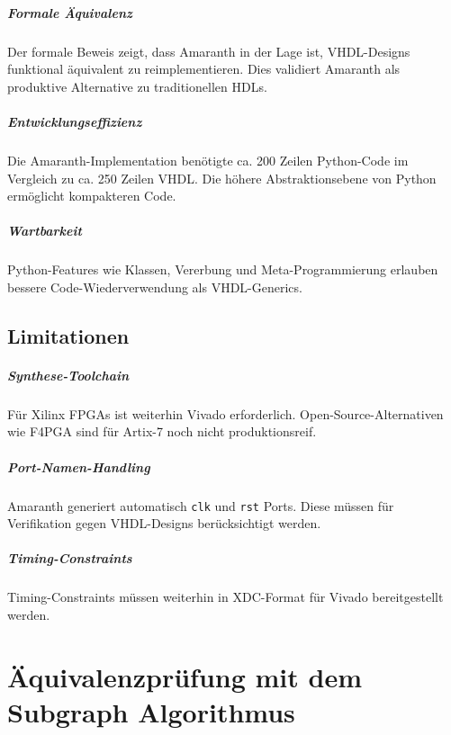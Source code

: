 ﻿\documentclass[12pt,a4paper]{report}
\begin{document}
\paragraph{Formale Äquivalenz}
Der formale Beweis zeigt, dass Amaranth in der Lage ist, VHDL-Designs funktional äquivalent zu reimplementieren. Dies validiert Amaranth als produktive Alternative zu traditionellen HDLs.

\paragraph{Entwicklungseffizienz}
Die Amaranth-Implementation benötigte ca. 200 Zeilen Python-Code im Vergleich zu ca. 250 Zeilen VHDL. Die höhere Abstraktionsebene von Python ermöglicht kompakteren Code.

\paragraph{Wartbarkeit}
Python-Features wie Klassen, Vererbung und Meta-Programmierung erlauben bessere Code-Wiederverwendung als VHDL-Generics.

\section{Limitationen}

\paragraph{Synthese-Toolchain}
Für Xilinx FPGAs ist weiterhin Vivado erforderlich. Open-Source-Alternativen wie F4PGA sind für Artix-7 noch nicht produktionsreif.

\paragraph{Port-Namen-Handling}
Amaranth generiert automatisch \texttt{clk} und \texttt{rst} Ports. Diese müssen für Verifikation gegen VHDL-Designs berücksichtigt werden.

\paragraph{Timing-Constraints}
Timing-Constraints müssen weiterhin in XDC-Format für Vivado bereitgestellt werden.

\chapter{Äquivalenzprüfung mit dem Subgraph Algorithmus}
\label{sec:subgraph_equiv}
\end{document}
